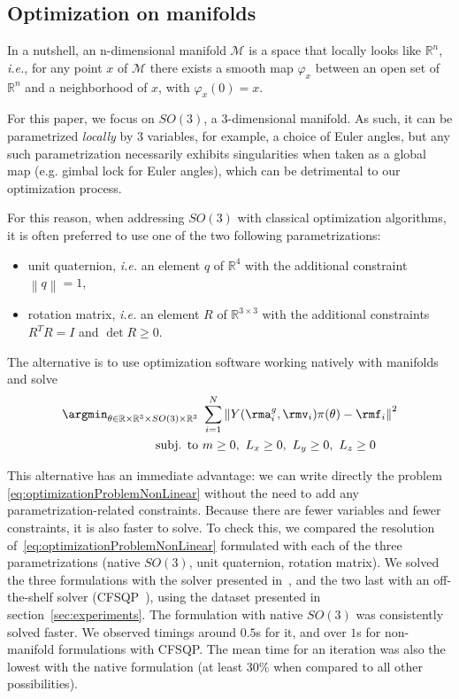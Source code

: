 \subsection{Optimization on manifolds}

In a nutshell, an n-dimensional manifold $\mathcal{M}$ is a space that locally looks like $\mathbb{R}^n$, \emph{i.e.}, for any point $x$ of $\mathcal{M}$ there exists a smooth map $\varphi_x$ between an open set of $\mathbb{R}^n$ and a neighborhood of $x$, with $\varphi_x(0) = x$.

For this paper, we focus on $SO(3)$, a 3-dimensional manifold. As such, it can be parametrized \emph{locally} by $3$ variables, for example, a choice of Euler angles, but any such parametrization necessarily exhibits singularities when taken as a global map (e.g. gimbal lock for Euler angles), which can be detrimental to our optimization process.

For this reason, when addressing $SO(3)$ with classical optimization algorithms, it is often preferred to use one of the two following parametrizations:
\begin{itemize}
    \item unit quaternion, \emph{i.e.} an element $q$ of $\mathbb{R}^4$ with the additional constraint $\left\|q\right\| = 1$,
    \item rotation matrix, \emph{i.e.} an element $R$ of $\mathbb{R}^{3 \times 3}$ with the additional constraints $R^T R = I$ and $\det{R} \geq 0$. 
\end{itemize}

The alternative is to use optimization software working natively with manifolds~\cite{brossette2015humanoid}\cite{absil:book:2008} and solve
\begin{align}
\label{eq:finalProblem}
    \argmin_{\theta \in \mathbb{R}\times\mathbb{R}^3\times SO(3) \times \mathbb{R}^3} &\ \sum_{i = 1}^N \left\| Y(\rma^g_i, \rmv_i) \pi(\theta) - \rmf_i \right\|^2 \\
    \mbox{subj. to} &\ m \geq 0,\ L_x \geq 0,\ L_y \geq 0,\ L_z \geq 0
\end{align}

This alternative has an immediate advantage: we can write directly the problem \eqref{eq:optimizationProblemNonLinear} without the need to add any parametrization-related constraints. Because there are fewer variables and fewer constraints, it is also faster to solve. To check this, we compared the resolution of~\eqref{eq:optimizationProblemNonLinear} formulated with each of the three parametrizations (native $SO(3)$, unit quaternion, rotation matrix). We solved the three formulations with the solver presented in~\cite{brossette2015humanoid}, and the two last with an off-the-shelf solver (CFSQP~\cite{cfsqp:manual}), using the dataset presented in section~\ref{sec:experiments}. 
The formulation with native $SO(3)$ was consistently solved faster. We observed timings around $0.5$s for it, and over $1$s for non-manifold formulations with CFSQP. The mean time for an iteration was also the lowest with the native formulation (at least $30\%$ when compared to all other possibilities).

